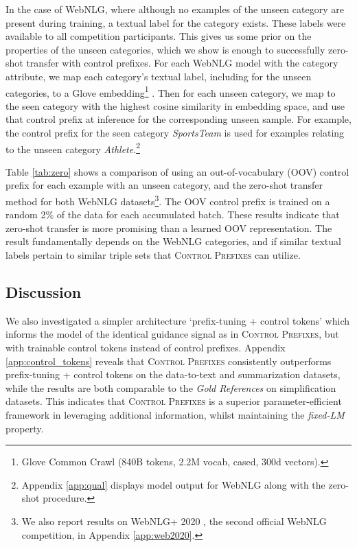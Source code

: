 \documentclass[11pt]{article}
\newcommand{\control}{\textsc{Control Prefixes}\xspace}
\begin{document}
In the case of WebNLG, where although no examples of the unseen category are present during training, a textual label for the category exists. These labels were available to all competition participants. This gives us some prior on the properties of the unseen
categories, which we show is enough to successfully zero-shot transfer with control prefixes. For each WebNLG model with the category attribute, we map each category's textual label, including for the unseen categories, to a Glove embedding\footnote{Glove Common Crawl (840B tokens, 2.2M vocab, cased, 300d vectors).} \citep{glove}. Then for each unseen category, we map to the seen category with the highest cosine similarity in embedding space, and use that control prefix at inference for the corresponding unseen sample. For example, the control prefix for the seen category \emph{SportsTeam} is used for examples relating to the unseen category \emph{Athlete}.\footnote{Appendix \ref{app:qual} displays model output for WebNLG along with the zero-shot procedure.}


Table \ref{tab:zero} shows a comparison of using an out-of-vocabulary (OOV) control prefix for each example with an unseen category, and the zero-shot transfer method for both WebNLG datasets\footnote{We also report results on WebNLG+ 2020 \citep{web2020}, the second official WebNLG competition, in Appendix \ref{app:web2020}.}. The OOV control prefix is trained on a random 2\% of the data for each accumulated batch. These results indicate that zero-shot transfer is more promising than a learned OOV representation. The result fundamentally depends on the WebNLG categories, and if similar textual labels pertain to similar triple sets that \control can utilize.

\subsection{Discussion}

We also investigated a simpler architecture \enquote*{prefix-tuning + control tokens} which informs the model of the identical guidance signal as in \control, but with trainable control tokens instead of control prefixes. Appendix \ref{app:control_tokens} reveals that \control consistently outperforms prefix-tuning + control tokens on the data-to-text and summarization datasets, while the results are both comparable to the \emph{Gold References} on simplification datasets. This indicates that \control is a superior parameter-efficient framework in leveraging additional information, whilst maintaining the \emph{fixed-LM} property.
\end{document}
